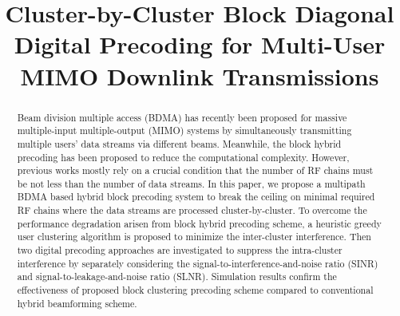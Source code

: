 \documentclass[conference]{IEEEtran}
\begin{document}
\title{Cluster-by-Cluster Block Diagonal Digital Precoding for Multi-User MIMO Downlink Transmissions}
\author{}
\maketitle\thispagestyle{plain}\pagestyle{plain}

\begin{abstract}
Beam division multiple access (BDMA) has recently been proposed for massive multiple-input multiple-output (MIMO) systems by simultaneously transmitting multiple users' data streams via different beams. Meanwhile, the block hybrid precoding has been proposed to reduce the computational complexity. However, previous works mostly rely on a crucial condition that the number of RF chains must be not less than the number of data streams. In this paper, we propose a multipath BDMA based hybrid block precoding system to break the ceiling on minimal required RF chains where the data streams are processed cluster-by-cluster. To overcome the performance degradation arisen from block hybrid precoding scheme, a heuristic greedy user clustering algorithm is proposed to minimize the inter-cluster interference. Then two digital precoding approaches are investigated to suppress the intra-cluster interference by separately considering the signal-to-interference-and-noise ratio (SINR) and signal-to-leakage-and-noise ratio (SLNR). Simulation results confirm the effectiveness of proposed block clustering precoding scheme compared to conventional hybrid beamforming scheme.
\end{abstract}
\end{document}
